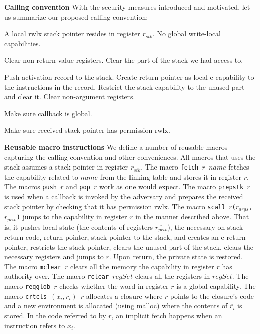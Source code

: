 \documentclass[compsoc,conference,letterpaper,fleqn]{IEEEtran}
\newcommand{\var}[1]{\mathit{#1}}
\newcommand{\stk}{\var{stk}}
\newcommand{\plainperm}[1]{\mathrm{#1}}
\newcommand{\entry}{\plainperm{e}}
\newcommand{\rwlx}{\plainperm{rwlx}}
\begin{document}
\textbf{Calling convention} With the security measures introduced and motivated,
let us summarize our proposed calling convention:
\begin{description}[font=\normalfont\itshape]
\item[At program start-up] A local $\rwlx$ stack pointer resides in register $r_\stk$. No global write-local capabilities.
\item[Before returning to the adversary] Clear non-return-value registers. Clear the part of the stack we had access to.
\item[Before invoking the adversary] Push activation record to the stack. Create
  return pointer as local $\entry$-capability to the instructions in the record.
  Restrict the stack capability to the unused part and clear it. Clear
  non-argument registers.
\item[Before invoking an adversary callback] Make sure callback is global.
\item[When called by an adversary] Make sure received stack pointer has permission $\rwlx$.
\end{description}
\textbf{Reusable macro instructions} We define a number of reusable
macros capturing the calling convention and other conveniences. All
macros that uses the stack assumes a stack pointer in register
$r_\stk$. The macro \texttt{\footnotesize{fetch $r$ $\var{name}$}} fetches the
capability related to $\var{name}$ from the linking table and stores
it in register $r$.  The macros \texttt{\footnotesize{push $r$}} and
\texttt{\footnotesize{pop $r$}} work as one would
expect. The macro \texttt{\footnotesize{prepstk $r$}} is used when a callback is
invoked by the adversary and prepares the received stack pointer by
checking that it has permission $\rwlx$.  The macro \texttt{\footnotesize{scall
    $r$($\overline{r_{\var{args}}}$,$\overline{r_{\var{priv}}}$)}}
jumps to the capability in register $r$ in the manner described
above. That is, it pushes local state (the contents of registers
$\overline{r_{\var{priv}}}$), the necessary on stack return code,
return pointer, stack pointer to the stack, and creates an $\entry$
return pointer, restricts the stack pointer, clears the unused part of
the stack, clears the necessary registers and jumps to $r$.  Upon
return, the private state is restored. The macro \texttt{\footnotesize{mclear
    $r$}} clears all the memory the capability in register $r$ has
authority over.  The macro \texttt{\footnotesize{rclear $\var{regSet}$}} clears
all the registers in $\var{regSet}$. The macro \texttt{\footnotesize{reqglob
    $r$}} checks whether the word in register $r$ is a global
capability. The macro \texttt{\footnotesize{crtcls $\overline{(x_i,r_i)}$ $r$}}
allocates a closure where $r$ points to the closure's code and a new
environment is allocated (using malloc) where the contents of
$\overline{r_i}$ is stored. In the code referred to by $r$, an
implicit fetch happens when an instruction refers to $x_i$.
\end{document}
